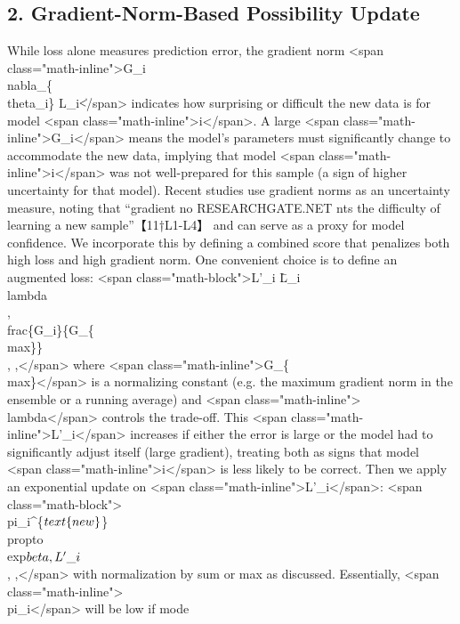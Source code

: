 \documentclass{article}
\begin{document}
\subsection*{2. Gradient-Norm-Based Possibility Update}
While loss alone measures prediction error, the gradient norm <span class="math-inline">G\_i\=\|\\nabla\_\{\\theta\_i\} L\_i\|</span> indicates how surprising or difficult the new data is for model <span class="math-inline">i</span>. A large <span class="math-inline">G\_i</span> means the model’s parameters must significantly change to accommodate the new data, implying that model <span class="math-inline">i</span> was not well-prepared for this sample (a sign of higher uncertainty for that model). Recent studies use gradient norms as an uncertainty measure, noting that “gradient no​
RESEARCHGATE.NET
nts the difficulty of learning a new sample”【11†L1-L4】 and can serve as a proxy for model confidence. We incorporate this by defining a combined score that penalizes both high loss and high gradient norm. One convenient choice is to define an augmented loss:
<span class="math-block">L'\_i \= L\_i \+ \\lambda \\, \\frac\{G\_i\}\{G\_\{\\max\}\} \\, ,</span>
where <span class="math-inline">G\_\{\\max\}</span> is a normalizing constant (e.g. the maximum gradient norm in the ensemble or a running average) and <span class="math-inline">\\lambda</span> controls the trade-off. This <span class="math-inline">L'\_i</span> increases if either the error is large or the model had to significantly adjust itself (large gradient), treating both as signs that model <span class="math-inline">i</span> is less likely to be correct. Then we apply an exponential update on <span class="math-inline">L'\_i</span>:
<span class="math-block">\\pi\_i^\{\(\\text\{new\}\)\} \\propto \\exp\(\-\\beta \\, L'\_i\) \\, ,</span>
with normalization by sum or max as discussed. Essentially, <span class="math-inline">\\pi\_i</span> will be low if mode​
\end{document}
